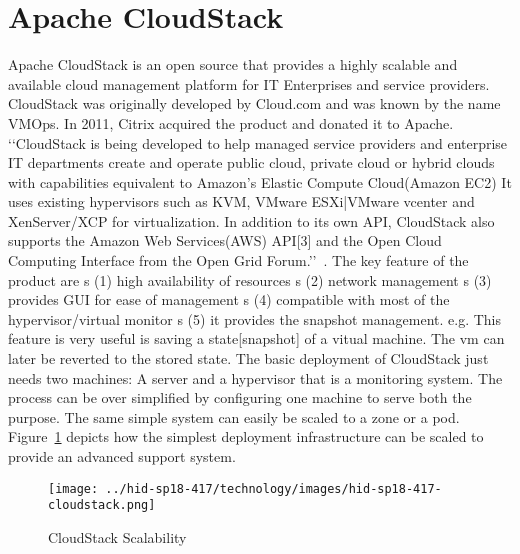 
\section{Apache CloudStack}
Apache CloudStack is an open source that provides a highly scalable
and available cloud management platform for IT Enterprises and service
providers. CloudStack was originally developed by Cloud.com and was
known by the name VMOps.  In 2011, Citrix acquired the product and
donated it to Apache.
‘‘CloudStack is being developed to help managed service providers and
enterprise IT departments create and operate public cloud, private
cloud or hybrid clouds with capabilities equivalent to Amazon's
Elastic Compute Cloud(Amazon EC2) It uses existing hypervisors such
as KVM, VMware ESXi|VMware vcenter and XenServer/XCP for
virtualization. In addition to its own API, CloudStack also supports
the Amazon Web Services(AWS) API[3] and the Open Cloud Computing
Interface from the Open Grid Forum.’’~\cite{hid-sp18-417-wiki-cloudStack}.
The key feature of the product are 
s (1) high availability of resources
s (2) network management
s (3) provides GUI for ease of management
s (4) compatible with most of the hypervisor/virtual monitor
s (5) it provides the snapshot management. e.g. This feature is 
very useful is saving a state[snapshot] of a vitual machine. 
The vm can later be reverted to the stored state.  
The basic deployment of CloudStack just needs two machines: 
 A server and a hypervisor that is a monitoring system.  The process
can be over simplified by configuring one machine to serve both the
purpose.
The same simple system can easily be scaled to a zone or a pod.
Figure~\ref{F:cloudstack-scalabuility} depicts how the simplest
deployment infrastructure can be scaled to provide an advanced support
system.
\begin{figure}[htb]
  \texttt{[image: ../hid-sp18-417/technology/images/hid-sp18-417-cloudstack.png]}
  \caption{CloudStack Scalability~\cite{hid-sp18-417-cloudstack-scaling}}
  \label{F:cloudstack-scalabuility}
\end{figure}
